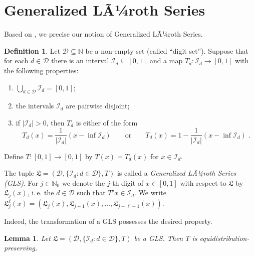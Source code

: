 \documentclass{amsart}
\newtheorem{lemma}[theorem]{Lemma}
\theoremstyle{definition}
\newtheorem{definition}[theorem]{Definition}
\theoremstyle{remark}
\begin{document}
\section{Generalized LÃ¼roth Series}\label{sect:gls}
Based on \cite[pp.~41--50]{def-gls}, we precise our notion of Generalized LÃ¼roth Series.
\begin{definition}\label{def:gls}
Let ${\ensuremath{\mathcal D}}\subseteq{\ensuremath{\mathbb N}}$ be a non-empty set (called ``digit set''). Suppose that for each
$d\in{\ensuremath{\mathcal D}}$ there is an interval ${\ensuremath{\mathcal I}}_d\subseteq[0,1]$ and a map $T_d\colon{\ensuremath{\mathcal I}}_d\to[0,1]$
with the following properties:
\begin{enumerate}
\item\label{it:union} $\displaystyle\bigcup_{d\in{\ensuremath{\mathcal D}}}{\ensuremath{\mathcal I}}_d=[0,1]$;
\item\label{it:disjoint} the intervals ${\ensuremath{\mathcal I}}_d$ are pairwise disjoint;
\item if $|{\ensuremath{\mathcal I}}_d|>0$, then $T_d$ is either of the form
\[ T_d(x) = \frac1{|{\ensuremath{\mathcal I}}_d|}(x-\inf{\ensuremath{\mathcal I}}_d) \qquad\text{or}\qquad T_d(x) = 1-\frac1{|{\ensuremath{\mathcal I}}_d|}(x-\inf{\ensuremath{\mathcal I}}_d) \;. \]
\end{enumerate}
Define $T\colon[0,1]\to[0,1]$ by $T(x)=T_d(x)$ for $x\in{\ensuremath{\mathcal I}}_d$.

The tuple ${\ensuremath{\mathfrak L}}=({\ensuremath{\mathcal D}},\{{\ensuremath{\mathcal I}}_d:d\in{\ensuremath{\mathcal D}}\},T)$ is called a \emph{Generalized LÃ¼roth Series (GLS)}. For $j\in{\ensuremath{\mathbb N}}_0$ we denote the $j$-th digit of $x\in[0,1]$ with respect to ${\ensuremath{\mathfrak L}}$ by ${\ensuremath{\mathfrak L}}_j(x)$, i.\,e. the $d\in{\ensuremath{\mathcal D}}$ such that $T^jx\in{\ensuremath{\mathcal I}}_d$.
We write ${\ensuremath{\mathfrak L}}_j^\ell(x)=({\ensuremath{\mathfrak L}}_j(x),{\ensuremath{\mathfrak L}}_{j+1}(x),\dots,{\ensuremath{\mathfrak L}}_{j+\ell-1}(x))$.
\end{definition}
Indeed, the transformation of a GLS possesses the desired property.
\begin{lemma}\label{lem:gls-equipres}
Let ${\ensuremath{\mathfrak L}}=({\ensuremath{\mathcal D}},\{{\ensuremath{\mathcal I}}_d:d\in{\ensuremath{\mathcal D}}\},T)$ be a GLS. Then $T$ is equidistribution-preserving.
\end{lemma}
\end{document}
